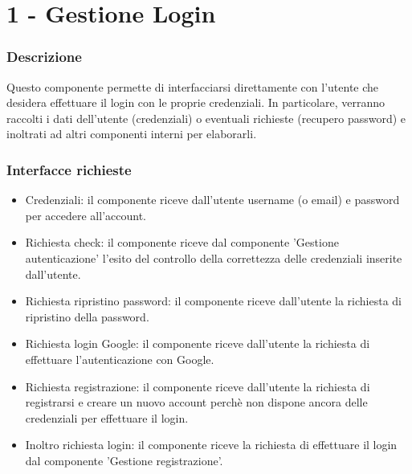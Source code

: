 \documentclass[a4paper,12pt]{article}
\begin{document}
\section*{1 - Gestione Login}
\subsubsection*{Descrizione}
Questo componente permette di interfacciarsi direttamente con l’utente che desidera effettuare il login con le proprie credenziali. In particolare, verranno raccolti i dati dell’utente (credenziali) o eventuali richieste (recupero password) e inoltrati ad altri componenti interni per elaborarli.

\subsubsection*{Interfacce richieste}
\begin{itemize} \setlength\itemsep{0.01em}
\item {\sffamily Credenziali}: il componente riceve dall'utente username (o email) e password per accedere all'account.
\item {\sffamily Richiesta check}: il componente riceve dal componente 'Gestione autenticazione' l'esito del controllo della correttezza delle credenziali inserite dall'utente.
\item {\sffamily Richiesta ripristino password}: il componente riceve dall'utente la richiesta di ripristino della password.
\item {\sffamily Richiesta login Google}: il componente riceve dall'utente la richiesta di effettuare l'autenticazione con Google.
\item {\sffamily Richiesta registrazione}: il componente riceve dall'utente la richiesta di registrarsi e creare un nuovo account perchè non dispone ancora delle credenziali per effettuare il login.
\item {\sffamily Inoltro richiesta login}: il componente riceve la richiesta di effettuare il login dal componente 'Gestione registrazione'.
\end{itemize}
\end{document}
